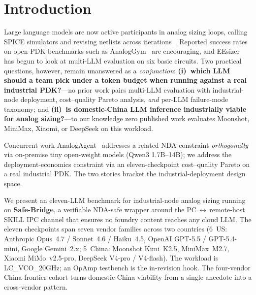 
\section{Introduction}
\label{sec:intro}

Large language models are now active participants in analog sizing
loops, calling SPICE simulators and revising netlists across
iterations~\cite{analogcoder,adollm,eesizer,anaflow,ledro,autosizer,analogsage}.
Reported success rates on open-PDK benchmarks such as
AnalogGym~\cite{analoggym} are encouraging, and
EEsizer~\cite{eesizer} has begun to look at multi-LLM evaluation on
six basic circuits. Two practical questions, however, remain
unanswered as a \emph{conjunction}: \textbf{(i)~which LLM should a
team pick under a token budget when running against a real
industrial PDK?}---no prior work pairs multi-LLM evaluation with
industrial-node deployment, cost--quality Pareto analysis,
\emph{and} per-LLM failure-mode taxonomy; and \textbf{(ii)~is
domestic-China LLM inference industrially viable for analog
sizing?}---to our knowledge zero published work evaluates Moonshot,
MiniMax, Xiaomi, or DeepSeek on this workload.

Concurrent work AnalogAgent~\cite{analogagent} addresses a related
NDA constraint \emph{orthogonally} via on-premise tiny open-weight
models (Qwen3 1.7B--14B); we address the deployment-economics
constraint via an eleven-checkpoint cost--quality Pareto on a real
industrial PDK. The two stories bracket the industrial-deployment
design space.

We present an eleven-LLM benchmark for industrial-node analog
sizing running on \textbf{Safe-Bridge}, a verifiable NDA-safe
wrapper around the PC\,$\leftrightarrow$\,remote-host SKILL IPC
channel that ensures no foundry content reaches any cloud LLM. The
eleven checkpoints span seven vendor families across two countries
(6~US: Anthropic Opus~4.7 / Sonnet~4.6 / Haiku~4.5, OpenAI
GPT-5.5 / GPT-5.4-mini, Google Gemini~2.x; 5~China: Moonshot
Kimi~K2.5, MiniMax~M2.7, Xiaomi MiMo~v2.5-pro, DeepSeek V4-pro /
V4-flash). The workload is LC\_VCO\_20GHz; an OpAmp testbench is
the in-revision hook. The four-vendor China-frontier cohort turns
domestic-China viability from a single anecdote into a cross-vendor
pattern.

